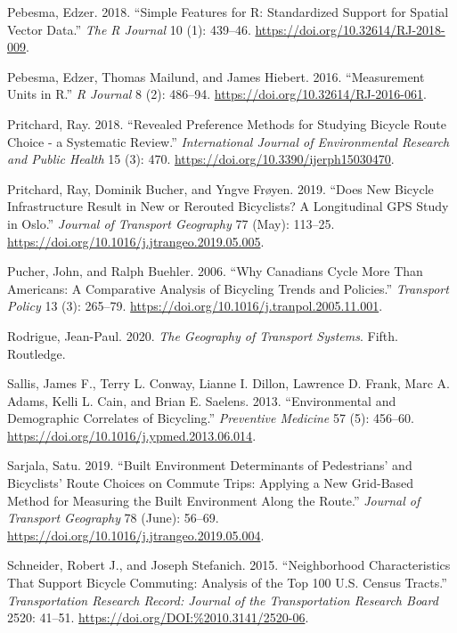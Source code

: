 \documentclass[smallextended]{svjour3}       %
\begin{document}
\leavevmode\hypertarget{ref-Pebesma2018}{}%
Pebesma, Edzer. 2018. ``Simple Features for R: Standardized Support for
Spatial Vector Data.'' \emph{The R Journal} 10 (1): 439--46.
\url{https://doi.org/10.32614/RJ-2018-009}.

\leavevmode\hypertarget{ref-Pebesma2016}{}%
Pebesma, Edzer, Thomas Mailund, and James Hiebert. 2016. ``Measurement
Units in R.'' \emph{R Journal} 8 (2): 486--94.
\url{https://doi.org/10.32614/RJ-2016-061}.

\leavevmode\hypertarget{ref-Pritchard2018}{}%
Pritchard, Ray. 2018. ``Revealed Preference Methods for Studying Bicycle
Route Choice - a Systematic Review.'' \emph{International Journal of
Environmental Research and Public Health} 15 (3): 470.
\url{https://doi.org/10.3390/ijerph15030470}.

\leavevmode\hypertarget{ref-Pritchard2019}{}%
Pritchard, Ray, Dominik Bucher, and Yngve Frøyen. 2019. ``Does New
Bicycle Infrastructure Result in New or Rerouted Bicyclists? A
Longitudinal GPS Study in Oslo.'' \emph{Journal of Transport Geography}
77 (May): 113--25. \url{https://doi.org/10.1016/j.jtrangeo.2019.05.005}.

\leavevmode\hypertarget{ref-Pucher2006}{}%
Pucher, John, and Ralph Buehler. 2006. ``Why Canadians Cycle More Than
Americans: A Comparative Analysis of Bicycling Trends and Policies.''
\emph{Transport Policy} 13 (3): 265--79.
\url{https://doi.org/10.1016/j.tranpol.2005.11.001}.

\leavevmode\hypertarget{ref-Rodrigue2020}{}%
Rodrigue, Jean-Paul. 2020. \emph{The Geography of Transport Systems}.
Fifth. Routledge.

\leavevmode\hypertarget{ref-Sallis2013}{}%
Sallis, James F., Terry L. Conway, Lianne I. Dillon, Lawrence D. Frank,
Marc A. Adams, Kelli L. Cain, and Brian E. Saelens. 2013.
``Environmental and Demographic Correlates of Bicycling.''
\emph{Preventive Medicine} 57 (5): 456--60.
\url{https://doi.org/10.1016/j.ypmed.2013.06.014}.

\leavevmode\hypertarget{ref-Sarjala2019}{}%
Sarjala, Satu. 2019. ``Built Environment Determinants of Pedestrians'
and Bicyclists' Route Choices on Commute Trips: Applying a New
Grid-Based Method for Measuring the Built Environment Along the Route.''
\emph{Journal of Transport Geography} 78 (June): 56--69.
\url{https://doi.org/10.1016/j.jtrangeo.2019.05.004}.

\leavevmode\hypertarget{ref-Schneider2015}{}%
Schneider, Robert J., and Joseph Stefanich. 2015. ``Neighborhood
Characteristics That Support Bicycle Commuting: Analysis of the Top 100
U.S. Census Tracts.'' \emph{Transportation Research Record: Journal of
the Transportation Research Board} 2520: 41--51.
\url{https://doi.org/DOI:\%2010.3141/2520-06}.
\end{document}
